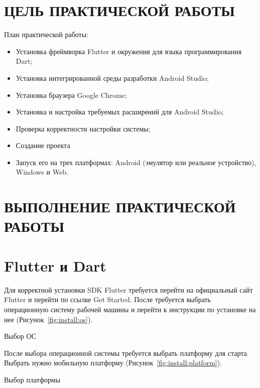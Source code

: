 \section*{ЦЕЛЬ ПРАКТИЧЕСКОЙ РАБОТЫ}

План практической работы:
\begin{itemize}
	\item Установка фреймворка Flutter
		и окружения для языка программирования Dart;
	\item Установка интегрированной среды разработки Android Studio;
	\item Установка браузера Google Chrome;
	\item Установка и настройка требуемых расширений для Android Studio;
	\item Проверка корректности настройки системы;
	\item Создание проекта
	\item Запуск его на трех платформах:
		Android (эмулятор или реальное устройство), Windows и Web.
\end{itemize}

\clearpage

\section*{ВЫПОЛНЕНИЕ ПРАКТИЧЕСКОЙ РАБОТЫ}
\section{Flutter и Dart}

Для корректной установки SDK Flutter требуется перейти
на официальный сайт Flutter и перейти по ссылке Get Started.
После требуется выбрать операционную систему рабочей машины
и перейти к инструкции по установке на нее (Рисунок~\ref{fig:install:os}).

\begin{image}
	\caption{Выбор ОС}
	\label{fig:install:os}
\end{image}

После выбора операционной системы требуется выбрать платформу для старта.
Выбрать нужно мобильную платформу (Рисунок~\ref{fig:install:platform}).

\begin{image}
	\caption{Выбор платформы}
	\label{fig:install:platform}
\end{image}

